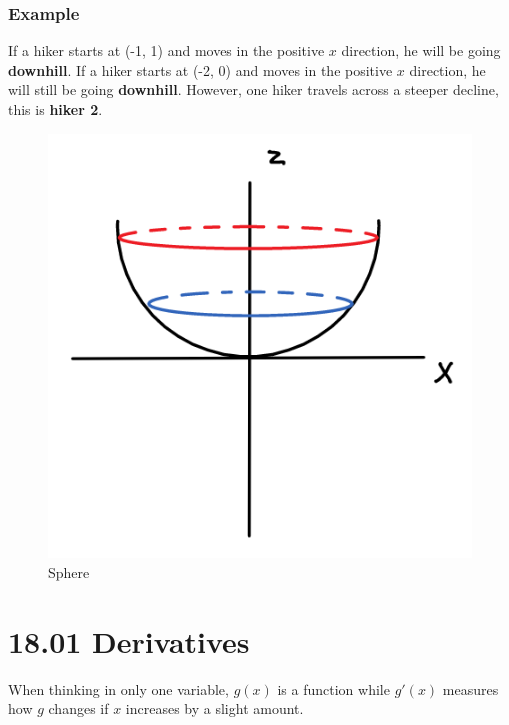 \documentclass{article}
\begin{document}
\subsubsection{ Example }

If a hiker starts at (-1, 1) and moves in the positive $x$ direction, he will be
going \textbf{downhill}. If a hiker starts at (-2, 0) and moves in the positive
$x$ direction, he will still be going \textbf{downhill}. However, one hiker
travels across a steeper decline, this is \textbf{hiker 2}.

\begin{figure}[H]
  \centering
  \includegraphics[scale=0.50]{"Sphere"}
  \caption{Sphere}
\end{figure}

\section{ 18.01 Derivatives }

When thinking in only one variable, $ g(x) $ is a function while $ g'(x) $
measures how $g$ changes if $x$ increases by a slight amount.
\end{document}
